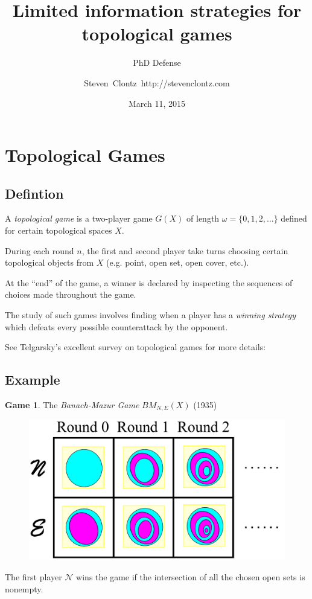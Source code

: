 \documentclass{beamer}
\title
{Limited information strategies for topological games}
\subtitle
{PhD Defense} %
\author%
{Steven~Clontz~http://stevenclontz.com}%
\institute[Auburn University] %
{
  Department of Mathematics and Statistics\\
  Auburn University}
\date[15-03-11] %
{March 11, 2015}
\theoremstyle{definition}
\newtheorem{game}[theorem]{Game}
\newcommand{\<}{\langle}
\renewcommand{\>}{\rangle}
\newcommand{\pl}[1]{\mathscr{#1}}
\newcommand{\term}{\textit}
\newcommand{\bmGame}[1]{{BM}_{N,E}(#1)}
\begin{document}
\renewcommand{\pause}{}
\newcommand{\vspacing}{\vspace{1em}}
\newcommand{\vpause}{\pause\vspacing}

\begin{frame}
  \titlepage
\end{frame}

\section{Topological Games}

\subsection{Defintion}

\begin{frame}
  A \term{topological game} is a two-player game $G(X)$ of length
  $\omega=\{0,1,2,\dots\}$ defined for certain topological spaces $X$.

  \vpause

  During each round $n$, the first and second player take turns choosing
  certain topological objects from $X$ (e.g. point, open set, open cover, etc.).

  \vpause

  At the ``end'' of the game, a winner is declared by inspecting the sequences
  of choices made throughout the game.

  \vpause

  The study of such games involves finding when a player has a
  \term{winning strategy} which defeats every possible counterattack by
  the opponent.

  \vpause

  {\tiny See Telgarsky's excellent survey on topological games for more
  details: \cite{MR892457}}
\end{frame}

\subsection{Example}

\begin{frame}
  \small
  \begin{game}
    The \term{Banach-Mazur Game}
    $\bmGame{X}$ (1935) \cite{MR666400}

    \begin{figure}
      \includegraphics[width=0.6\linewidth]{bmGameAlt.pdf}
    \end{figure}

  The first player $\pl N$ wins the game if the intersection of all the chosen
  open sets is nonempty.
  \end{game}
\end{frame}
\end{document}
